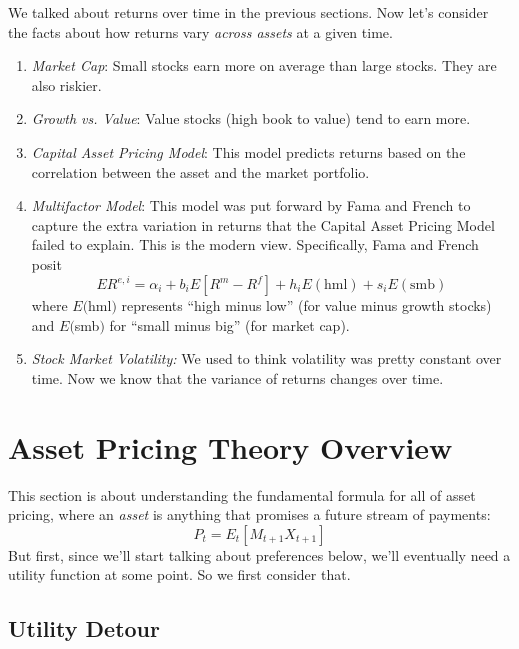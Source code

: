 \documentclass[a4paper,12pt]{scrartcl}
\begin{document}
We talked about returns over time in the previous sections. Now 
let's consider the facts about how returns vary \emph{across assets}
at a given time.
\begin{enumerate}
    \item {\sl Market Cap}: Small stocks earn more on average than
	large stocks.  They are also riskier.
    \item {\sl Growth vs. Value}: Value stocks (high book to value)
	tend to earn more.
    \item {\sl Capital Asset Pricing Model}: This model predicts
	returns based on the correlation between the asset and
	the market portfolio.
    \item {\sl Multifactor Model}: This model was put forward by
	Fama and French to capture the extra variation in returns
	that the Capital Asset Pricing Model failed to explain.
	This is the modern view. Specifically, Fama and French posit
	\begin{equation}
	    \label{ff3fm}
	    ER^{e,i} = \alpha_i + b_iE[R^m - R^f] + h_i E(\text{hml})
		+ s_i E(\text{smb})
	\end{equation}
	where $E($hml$)$ represents ``high minus low'' (for 
	value minus growth stocks)
	and $E($smb$)$ for ``small minus big'' (for market cap).
    \item {\sl Stock Market Volatility:} We used to think volatility
	was pretty constant over time.  Now we know that the
	variance of returns changes over time.
\end{enumerate}


\newpage
\section{Asset Pricing Theory Overview}

This section is about understanding the fundamental formula for 
all of asset pricing, where an \emph{asset} is anything
that promises a future stream of payments: 
\begin{equation}
    \label{pemx}
    P_t = E_t[M_{t+1} X_{t+1}]
\end{equation}
But first, since we'll start talking about preferences below, 
we'll eventually need a utility function at some point. So we 
first consider that.

\subsection{Utility Detour}
\end{document}
